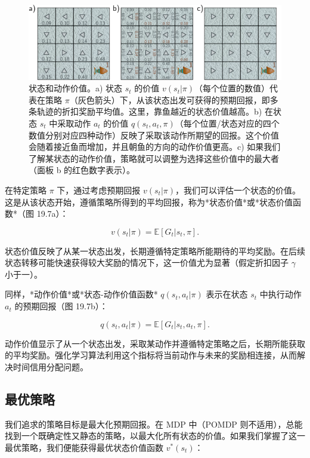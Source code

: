 \begin{figure}[ht!]
\centering
\includegraphics[width=0.7\linewidth]{png/chapter19/ReinforceValueOfAction.png}
\caption{状态和动作价值。a) 状态 \(s_t\) 的价值 \(v(s_t|\pi)\)（每个位置的数值）代表在策略 \(\pi\)（灰色箭头）下，从该状态出发可获得的预期回报，即多条轨迹的折扣奖励平均值。这里，靠鱼越近的状态价值越高。b) 在状态 \(s_t\) 中采取动作 \(a_t\) 的价值 \(q(s_t, a_t, \pi)\)（每个位置/状态对应的四个数值分别对应四种动作）反映了采取该动作所期望的回报。这个价值会随着接近鱼而增加，并且朝鱼的方向的动作价值更高。c) 如果我们了解某状态的动作价值，策略就可以调整为选择这些价值中的最大者（面板 b 的红色数字表示）。}
\end{figure}

在特定策略 \(\pi\) 下，通过考虑预期回报 \(v(s_t|\pi)\)，我们可以评估一个状态的价值。这是从该状态开始，遵循策略所得到的平均回报，称为*状态价值*或*状态价值函数*（图 19.7a）：

\begin{equation}
v(s_t|\pi) = \mathbb{E} [ G_t|s_t, \pi ]. 
\end{equation}

状态价值反映了从某一状态出发，长期遵循特定策略所能期待的平均奖励。在后续状态转移可能快速获得较大奖励的情况下，这一价值尤为显著（假定折扣因子 \(\gamma\) 小于一）。

同样，*动作价值*或*状态-动作价值函数* \(q(s_t, a_t|\pi)\) 表示在状态 \(s_t\) 中执行动作 \(a_t\) 的预期回报（图 19.7b）：

\begin{equation}
q(s_t, a_t|\pi) = \mathbb{E} [ G_t|s_t, a_t, \pi ]. 
\end{equation}

动作价值显示了从一个状态出发，采取某动作并遵循特定策略之后，长期所能获取的平均奖励。强化学习算法利用这个指标将当前动作与未来的奖励相连接，从而解决时间信用分配问题。


\subsection{最优策略}
我们追求的策略目标是最大化预期回报。在 MDP 中（POMDP 则不适用），总能找到一个既确定性又静态的策略，以最大化所有状态的价值。如果我们掌握了这一最优策略，我们便能获得最优状态价值函数 \(v^*(s_t)\)：

